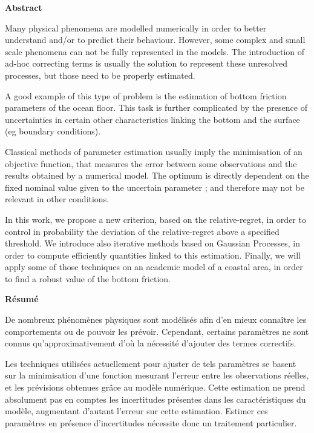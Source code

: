 \pagestyle{empty}


\small
\begin{center}
  \bf Abstract
\end{center}
\vspace{0.5cm}
Many physical phenomena are modelled numerically in order to better understand and/or to predict their behaviour. However, some complex and small scale phenomena can not be fully represented in the models. The introduction of ad-hoc correcting terms is usually the solution to represent these unresolved processes, but those need to be properly estimated.

 A good example of this type of problem is the estimation of bottom friction parameters of the ocean floor. This task is further complicated by the presence of uncertainties in certain other characteristics linking the bottom and the surface (eg boundary conditions).

 Classical methods of parameter estimation usually imply the minimisation of an objective function, that measures the error between some observations and the results obtained by a numerical model. The optimum is directly dependent on the fixed nominal value given to the uncertain parameter ; and therefore may not be relevant in other conditions. 

In this work, we propose a new criterion, based on the relative-regret, in order to control in probability the deviation of the relative-regret above a specified threshold. We introduce also iterative methods based on Gaussian Processes, in order to compute efficiently quantities linked to this estimation.
Finally, we will apply some of those techniques on an academic model of a coastal area, in order to find a robust value of the bottom friction.

\vspace{1cm}
\etoile
\vspace{1cm}

\begin{center}
  \bf Résumé
\end{center}
\vspace{0.5cm}
De nombreux phénomènes physiques sont modélisés afin d'en mieux connaître les comportements ou de pouvoir les prévoir. Cependant, certains paramètres ne sont connus qu'ap\-proxi\-mati\-vement d'où la nécessité d'ajouter des termes correctifs. 

Les techniques utilisées actuellement pour ajuster de tels paramètres se basent sur la minimisation d'une fonction mesurant l'erreur entre les observations réelles, et les prévisions obtenues grâce au modèle numérique. Cette estimation ne prend absolument pas en comptes les incertitudes présentes dans les caractéristiques du modèle, augmentant d'autant l'erreur sur cette estimation. Estimer ces paramètres en présence d'incertitudes nécessite donc un traitement particulier.

